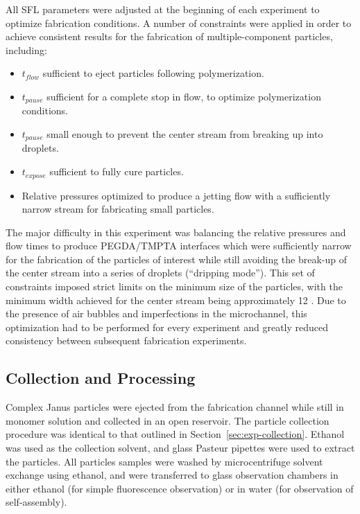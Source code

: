 All SFL parameters were adjusted at the beginning of each experiment to optimize fabrication 
conditions.  A number of constraints were applied in order to achieve consistent results for 
the fabrication of multiple-component particles, including:

\begin{itemize}
\item $t_{flow}$ sufficient to eject particles following polymerization.
\item $t_{pause}$ sufficient for a complete stop in flow, to optimize polymerization conditions.
\item $t_{pause}$ small enough to prevent the center stream from breaking up into droplets.
\item $t_{expose}$ sufficient to fully cure particles.
\item Relative pressures optimized to produce a jetting flow with a sufficiently narrow stream
for fabricating small particles.
\end{itemize}

The major difficulty in this experiment was balancing the relative pressures and flow times to produce
PEGDA/TMPTA interfaces which were sufficiently narrow for the fabrication of the particles of interest
while still avoiding the break-up of the center stream into a series of droplets (``dripping mode'').
This set of constraints imposed strict limits on the minimum size of the particles, with
the minimum width achieved for the center stream being approximately 12 \microns.
Due to the presence of air bubbles and imperfections in the microchannel, this optimization had to be
performed for every experiment and greatly reduced consistency between subsequent fabrication experiments.

\subsection{Collection and Processing}

Complex Janus particles were ejected from the fabrication channel while still in monomer solution and collected
in an open reservoir.  The particle collection procedure was identical to that outlined in 
Section~\ref{sec:exp-collection}. Ethanol was used as the collection solvent, and glass Pasteur
pipettes were used to extract the particles.  All particles samples
were washed by microcentrifuge solvent exchange using ethanol, and were transferred to 
glass observation
chambers in either ethanol (for simple fluorescence observation) or in water (for
observation of self-assembly).


